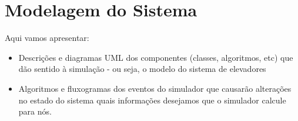 \chapter{\label{chap:modeling}Modelagem do Sistema}

Aqui vamos apresentar:

\begin{itemize}
  \item Descrições e diagramas UML dos componentes (classes, algoritmos, etc)
que dão sentido à simulação - ou seja, o modelo do sistema de elevadores
  \item Algoritmos e fluxogramas dos eventos do simulador que causarão
alterações no estado do sistema quais informações desejamos que o simulador
calcule para nós.
\end{itemize}